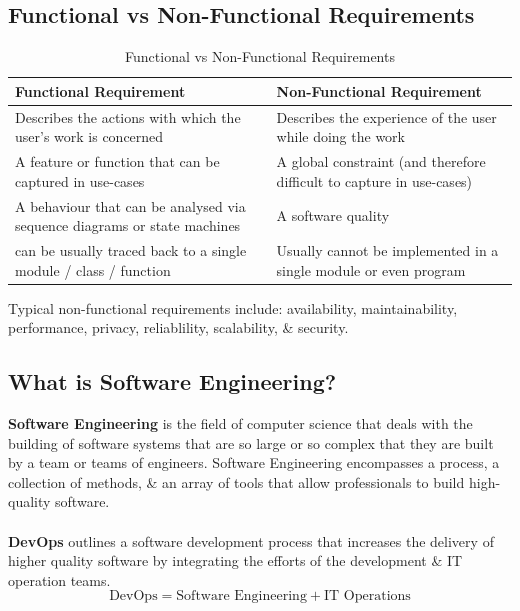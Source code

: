 \documentclass[a4paper,11pt]{article}
\begin{document}
\subsection{Functional vs Non-Functional Requirements}
\begin{table}[h!]
    \centering

    \begin{tabular}{|>{\arraybackslash}p{}|>{\arraybackslash}p{}|}
        \hline
        \textbf{Functional Requirement}                                             & \textbf{Non-Functional Requirement} \\
        \hline
        Describes the actions with which the user's work is concerned               & Describes the experience of the user while doing the work \\
        \hline
        A feature or function that can be captured in use-cases                     & A global constraint (and therefore difficult to capture in use-cases) \\
        \hline
        A behaviour that can be analysed via sequence diagrams or state machines    & A software quality \\
        \hline
        can be usually traced back to a single module / class / function            & Usually cannot be implemented in a single module or even program \\
        \hline
    \end{tabular}
    \caption{Functional vs Non-Functional Requirements}
\end{table}

Typical non-functional requirements include: availability, maintainability, performance, privacy, reliablility, scalability, \& security.

\subsection{What is Software Engineering?}
\textbf{Software Engineering} is the field of computer science that deals with the building of software systems that are so large or so complex
that they are built by a team or teams of engineers.
Software Engineering encompasses a process, a collection of methods, \& an array of tools that allow professionals to build high-quality software.
\\\\
\textbf{DevOps} outlines a software development process that increases the delivery of higher quality software by integrating the efforts of the development 
\& IT operation teams.
$$
    \text{DevOps} = \text{Software Engineering} + \text{IT Operations}
$$
\end{document}
